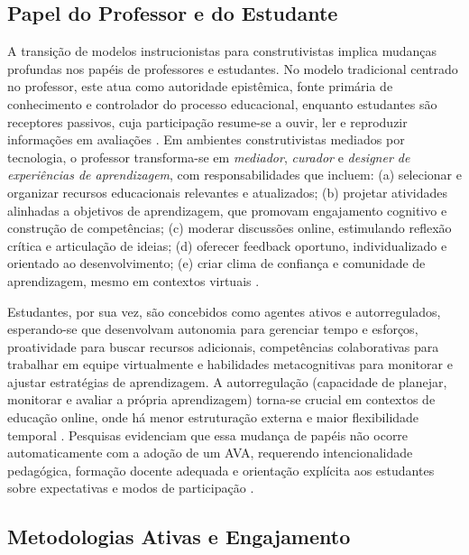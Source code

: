 \documentclass[portuguese]{sbc2025}%
\begin{document}
\subsection{Papel do Professor e do Estudante}

A transição de modelos instrucionistas para construtivistas implica mudanças profundas nos papéis de professores e estudantes. No modelo tradicional centrado no professor, este atua como autoridade epistêmica, fonte primária de conhecimento e controlador do processo educacional, enquanto estudantes são receptores passivos, cuja participação resume-se a ouvir, ler e reproduzir informações em avaliações \cite{Bates2015}. Em ambientes construtivistas mediados por tecnologia, o professor transforma-se em \textit{mediador}, \textit{curador} e \textit{designer de experiências de aprendizagem}, com responsabilidades que incluem: (a) selecionar e organizar recursos educacionais relevantes e atualizados; (b) projetar atividades alinhadas a objetivos de aprendizagem, que promovam engajamento cognitivo e construção de competências; (c) moderar discussões online, estimulando reflexão crítica e articulação de ideias; (d) oferecer feedback oportuno, individualizado e orientado ao desenvolvimento; (e) criar clima de confiança e comunidade de aprendizagem, mesmo em contextos virtuais \cite{Garrison2016, Anderson2003}.

Estudantes, por sua vez, são concebidos como agentes ativos e autorregulados, esperando-se que desenvolvam autonomia para gerenciar tempo e esforços, proatividade para buscar recursos adicionais, competências colaborativas para trabalhar em equipe virtualmente e habilidades metacognitivas para monitorar e ajustar estratégias de aprendizagem. A autorregulação (capacidade de planejar, monitorar e avaliar a própria aprendizagem) torna-se crucial em contextos de educação online, onde há menor estruturação externa e maior flexibilidade temporal \cite{Garrison2016}. Pesquisas evidenciam que essa mudança de papéis não ocorre automaticamente com a adoção de um AVA, requerendo intencionalidade pedagógica, formação docente adequada e orientação explícita aos estudantes sobre expectativas e modos de participação \cite{Koehler2009, Mishra2006}.

\subsection{Metodologias Ativas e Engajamento}
\end{document}
